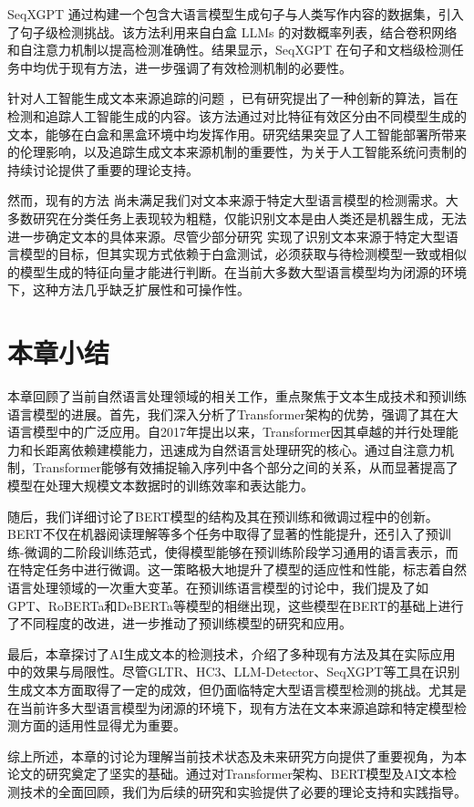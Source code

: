 SeqXGPT \cite{wang_seqxgpt_2023} 通过构建一个包含大语言模型生成句子与人类写作内容的数据集，引入了句子级检测挑战。该方法利用来自白盒 LLMs 的对数概率列表，结合卷积网络和自注意力机制以提高检测准确性。结果显示，SeqXGPT 在句子和文档级检测任务中均优于现有方法，进一步强调了有效检测机制的必要性。

针对人工智能生成文本来源追踪的问题 \cite{li_origin_2023}，已有研究提出了一种创新的算法，旨在检测和追踪人工智能生成的内容。该方法通过对比特征有效区分由不同模型生成的文本，能够在白盒和黑盒环境中均发挥作用。研究结果突显了人工智能部署所带来的伦理影响，以及追踪生成文本来源机制的重要性，为关于人工智能系统问责制的持续讨论提供了重要的理论支持。

然而，现有的方法 \cite{gehrmann_gltr_2019, guo_how_2023, wang_llm-detector_2024, wang_seqxgpt_2023} 尚未满足我们对文本来源于特定大型语言模型的检测需求。大多数研究在分类任务上表现较为粗糙，仅能识别文本是由人类还是机器生成，无法进一步确定文本的具体来源。尽管少部分研究 \cite{li_origin_2023} 实现了识别文本来源于特定大型语言模型的目标，但其实现方式依赖于白盒测试，必须获取与待检测模型一致或相似的模型生成的特征向量才能进行判断。在当前大多数大型语言模型均为闭源的环境下，这种方法几乎缺乏扩展性和可操作性。

\section{本章小结}
\label{sec:rw-conclusion}

本章回顾了当前自然语言处理领域的相关工作，重点聚焦于文本生成技术和预训练语言模型的进展。首先，我们深入分析了Transformer架构的优势，强调了其在大语言模型中的广泛应用。自2017年提出以来，Transformer因其卓越的并行处理能力和长距离依赖建模能力，迅速成为自然语言处理研究的核心。通过自注意力机制，Transformer能够有效捕捉输入序列中各个部分之间的关系，从而显著提高了模型在处理大规模文本数据时的训练效率和表达能力。

随后，我们详细讨论了BERT模型的结构及其在预训练和微调过程中的创新。BERT不仅在机器阅读理解等多个任务中取得了显著的性能提升，还引入了预训练-微调的二阶段训练范式，使得模型能够在预训练阶段学习通用的语言表示，而在特定任务中进行微调。这一策略极大地提升了模型的适应性和性能，标志着自然语言处理领域的一次重大变革。在预训练语言模型的讨论中，我们提及了如GPT、RoBERTa和DeBERTa等模型的相继出现，这些模型在BERT的基础上进行了不同程度的改进，进一步推动了预训练模型的研究和应用。

最后，本章探讨了AI生成文本的检测技术，介绍了多种现有方法及其在实际应用中的效果与局限性。尽管GLTR、HC3、LLM-Detector、SeqXGPT等工具在识别生成文本方面取得了一定的成效，但仍面临特定大型语言模型检测的挑战。尤其是在当前许多大型语言模型为闭源的环境下，现有方法在文本来源追踪和特定模型检测方面的适用性显得尤为重要。

综上所述，本章的讨论为理解当前技术状态及未来研究方向提供了重要视角，为本论文的研究奠定了坚实的基础。通过对Transformer架构、BERT模型及AI文本检测技术的全面回顾，我们为后续的研究和实验提供了必要的理论支持和实践指导。